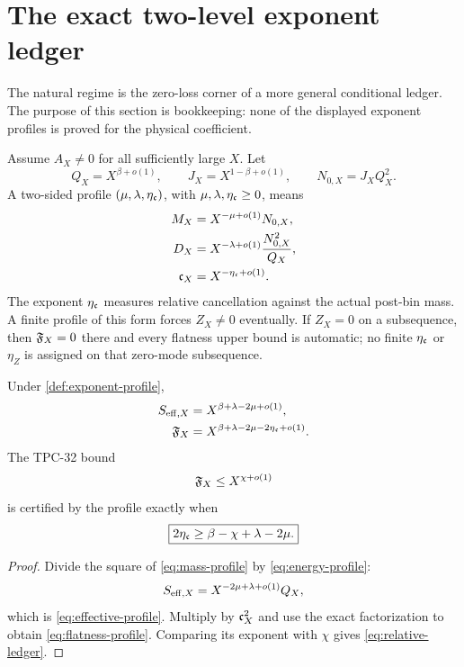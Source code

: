\section{The exact two-level exponent ledger}
\label{sec:exponent-ledger}

The natural regime is the zero-loss corner of a more general
conditional ledger.  The purpose of this section is bookkeeping:
none of the displayed exponent profiles is proved for the physical
coefficient.

\begin{definition}
\label{def:exponent-profile}
Assume \(A_X\ne0\) for all sufficiently large \(X\).  Let
\[
 Q_X=X^{\beta+o(1)},\qquad
 J_X=X^{1-\beta+o(1)},\qquad
 N_{0,X}=J_XQ_X^2.
\]
A two-sided profile \((\mu,\lambda,\eta_{\mathfrak c})\), with
\(\mu,\lambda,\eta_{\mathfrak c}\ge0\), means
\begin{align}
 M_X&=X^{-\mu+o(1)}N_{0,X},
 \label{eq:mass-profile}\\
 D_X&=X^{-\lambda+o(1)}
       \frac{N_{0,X}^2}{Q_X},
 \label{eq:energy-profile}\\
 \mathfrak c_X&=X^{-\eta_{\mathfrak c}+o(1)}.
 \label{eq:cancellation-profile}
\end{align}
The exponent \(\eta_{\mathfrak c}\) measures relative cancellation against
the actual post-bin mass.  A finite profile of this form forces
\(Z_X\ne0\) eventually.  If \(Z_X=0\) on a subsequence, then
\(\mathfrak F_X=0\) there and every flatness upper bound is automatic; no
finite \(\eta_{\mathfrak c}\) or \(\eta_Z\) is assigned on that zero-mode
subsequence.
\end{definition}

\begin{theorem}
\label{thm:profile-identities}
Under \cref{def:exponent-profile},
\begin{align}
 S_{\mathrm{eff},X}
 &=
 X^{\beta+\lambda-2\mu+o(1)},
 \label{eq:effective-profile}\\
 \mathfrak F_X
 &=
 X^{\beta+\lambda-2\mu-2\eta_{\mathfrak c}+o(1)}.
 \label{eq:flatness-profile}
\end{align}
The TPC-32 bound
\[
 \mathfrak F_X\le X^{\chi+o(1)}
\]
is certified by the profile exactly when
\begin{equation}
 \boxed{
 2\eta_{\mathfrak c}
 \ge
 \beta-\chi+\lambda-2\mu.}
\label{eq:relative-ledger}
\end{equation}
\end{theorem}

\begin{proof}
Divide the square of \eqref{eq:mass-profile} by
\eqref{eq:energy-profile}:
\[
 S_{\mathrm{eff},X}
 =
 X^{-2\mu+\lambda+o(1)}Q_X,
\]
which is \eqref{eq:effective-profile}.  Multiply by
\(\mathfrak c_X^2\) and use the exact factorization to obtain
\eqref{eq:flatness-profile}.  Comparing its exponent with \(\chi\)
gives \eqref{eq:relative-ledger}.
\end{proof}

